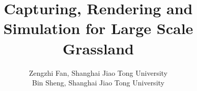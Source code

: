\documentclass[10pt,journal,compsoc]{IEEEtran}
\begin{document}
%
\title{Capturing, Rendering and Simulation for Large Scale Grassland}
%
%
%
%

\author{
Zengzhi Fan, Shanghai Jiao Tong University

Bin Sheng, Shanghai Jiao Tong University


}
\end{document}
